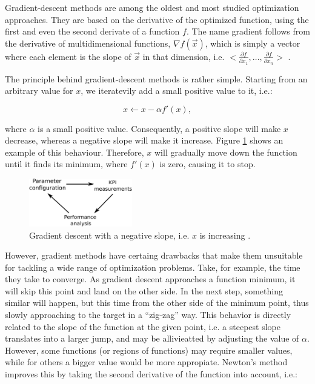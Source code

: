 Gradient-descent methods are among the oldest and most studied optimization
approaches. They are based on the derivative of the optimized function,
using the first and even the second derivate of a function $f$. The
name gradient follows from the derivative of multidimensional functions,
$\nabla f(\vec{x})$, which is simply a vector where each element
is the slope of $\vec{x}$ in that dimension, i.e. $<\frac{\partial f}{\partial x_{1}},\dots,\frac{\partial f}{\partial x_{n}}>$
\cite{Luke-Essentials_of_metaheuristics:2009}.

The principle behind gradient-descent methods is rather simple. Starting
from an arbitrary value for $x$, we iteratevily add a small positive
value to it, i.e.:

\begin{equation}
x\leftarrow x-\alpha f'(x),
\end{equation}


\noindent where $\alpha$ is a small positive value. Consequently,
a positive slope will make $x$ decrease, whereas a negative slope
will make it increase. Figure \ref{fig:02-gradient_descent} shows
an example of this behaviour. Therefore, $x$ will gradually move
down the function until it finds its minimum, where $f'(x)$ is zero,
causing it to stop.

\begin{figure}
\centering

\includegraphics[width=0.4\textwidth]{02-background_and_motivation/img/optimization_cycle}

\caption{Gradient descent with a negative slope, i.e. $x$ is increasing \cite{Luke-Essentials_of_metaheuristics:2009}.
\label{fig:02-gradient_descent}}
\end{figure}


However, gradient methods have certaing drawbacks that make them unsuitable
for tackling a wide range of optimization problems. Take, for example,
the time they take to converge. As gradient descent approaches a function
minimum, it will skip this point and land on the other side. In the
next step, something similar will happen, but this time from the other
side of the minimum point, thus slowly approaching to the target in
a ``zig-zag'' way. This behavior is directly related to the slope
of the function at the given point, i.e. a steepest slope translates
into a larger jump, and may be allivieatted by adjusting the value
of $\alpha$. However, some functions (or regions of functions) may
require smaller values, while for others a bigger value would be more
appropiate. Newton's method improves this by taking the second derivative
of the function into account, i.e.:

